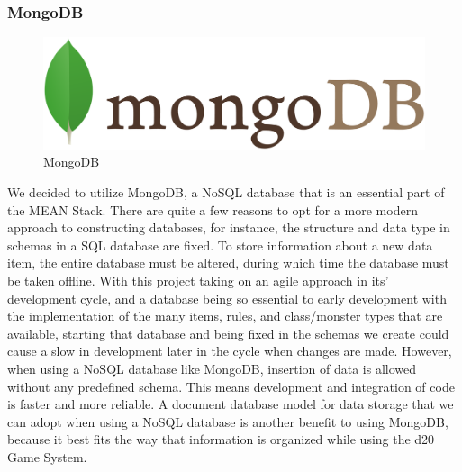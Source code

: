 \documentclass[12pt,a4paper]{report}
\begin{document}
			\subsubsection{MongoDB}
			\begin{figure}
				\includegraphics[scale=0.05]{mongoDB}
				\caption{MongoDB}
				\label{fig: MongoDB}
			\end{figure}
			We decided to utilize MongoDB, a NoSQL database that is an essential part of the MEAN Stack. There are quite a few reasons to opt for a more modern approach to constructing databases, for instance, the structure and data type in schemas in a SQL database are fixed. To store information about a new data item, the entire database must be altered, during which time the database must be taken offline. With this project taking on an agile approach in its’ development cycle, and a database being so essential to early development with the implementation of the many items, rules, and class/monster types that are available, starting that database and being fixed in the schemas we create could cause a slow in development later in the cycle when changes are made. However, when using a NoSQL database like MongoDB, insertion of data is allowed without any predefined schema. This means development and integration of code is faster and more reliable. A document database model for data storage that we can adopt when using a NoSQL database is another benefit to using MongoDB, because it best fits the way that information is organized while using the d20 Game System.
				
\end{document}
